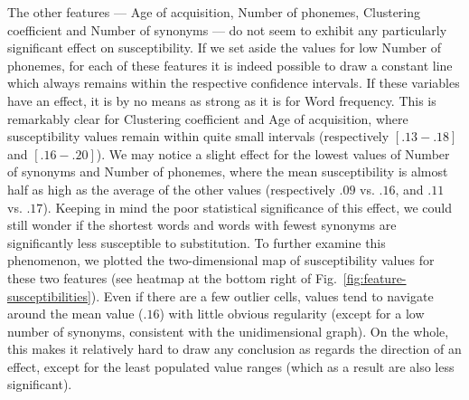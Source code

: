 The other features --- Age of acquisition, Number of phonemes, Clustering coefficient and Number of synonyms --- do not seem to exhibit any particularly significant effect on susceptibility.
{If we set aside the values for low Number of phonemes}, for each of these features it is indeed possible to draw a constant line which always remains within the respective confidence intervals.
If these variables have an effect, it is by no means as strong as it is for Word frequency.
This is remarkably clear for Clustering coefficient and Age of acquisition, where susceptibility values remain within quite small intervals (respectively $[.13-.18]$ and $[.16-.20]$).
{We may notice a slight effect for the lowest values of Number of synonyms and Number of phonemes, where the mean susceptibility is almost half as high as the average of the other values (respectively $.09$ vs. $.16$, and $.11$ vs. $.17$).}
Keeping in mind the poor statistical significance of this effect, we could still wonder if the shortest words and words with fewest synonyms are significantly less susceptible to substitution.
To further examine this phenomenon, we plotted the two-dimensional map of susceptibility values for these two features (see heatmap at the bottom right of Fig.~\ref{fig:feature-susceptibilities}).
{Even if there are a few outlier cells, values tend to navigate around the mean value ($.16$) with little obvious regularity (except for a low number of synonyms, consistent with the unidimensional graph)}. {On the whole, this makes it relatively hard to draw any conclusion as regards the direction of an effect, except for the least populated value ranges (which as a result are also less significant).}


